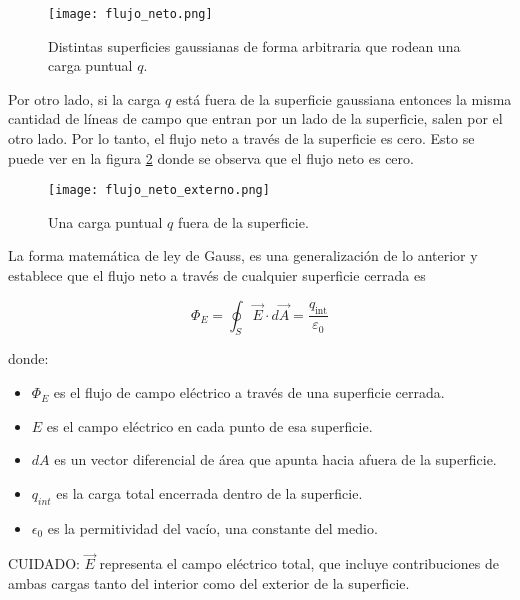 \begin{figure}[ht]
    \centering
    \texttt{[image: flujo\_neto.png]}
    \caption{Distintas superficies gaussianas de forma arbitraria que rodean una carga puntual \(q\).}
    \label{fig:superficie_gaussiana_arbitraria}
\end{figure}

Por otro lado, si la carga \(q\) está fuera de la superficie gaussiana entonces la misma cantidad de líneas de campo que entran por un lado de la superficie, salen por el otro lado. Por lo tanto, el flujo neto a través de la superficie es cero. Esto se puede ver en la figura \ref{fig:flujo_neto_2} donde se observa que el flujo neto es cero.

\begin{figure}[ht]
    \centering
    \texttt{[image: flujo\_neto\_externo.png]}
    \caption{Una carga puntual \(q\) fuera de la superficie.}
    \label{fig:flujo_neto_2}
\end{figure}

La forma matemática de ley de Gauss, es una generalización de lo anterior y establece que el flujo neto a través de cualquier superficie cerrada es

\begin{equation}
    \Phi_E = \oint_{S} \vec{E} \cdot d\vec{A} = \frac{q_{\text{int}}}{\varepsilon_0}
\end{equation}

donde:
\begin{itemize}
    \item \( \Phi_E \) es el flujo de campo eléctrico a través de una superficie cerrada.
    \item \(E\) es el campo eléctrico en cada punto de esa superficie.
    \item \(dA\) es un vector diferencial de área que apunta hacia afuera de la superficie.
    \item \(q_{int}\) es la carga total encerrada dentro de la superficie.
    \item \(\epsilon_0\) es la permitividad del vacío, una constante del medio.
\end{itemize}

\begin{tcolorbox}[mydanger]
    CUIDADO: \(\vec{E}\) representa el campo eléctrico total, que incluye contribuciones de ambas cargas tanto del interior como del exterior de la superficie.    
\end{tcolorbox}

